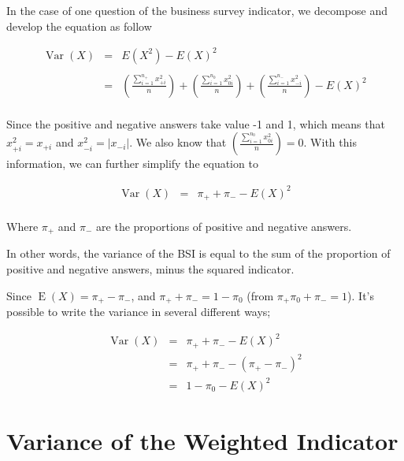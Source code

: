 \documentclass[12pt,a4paper,oneside]{book}
\DeclareMathOperator{\Var}{Var}
\DeclareMathOperator{\E}{E}
\begin{document}
In the case of one question of the business survey indicator, we decompose and develop the equation as follow

\begin{eqnarray}
\Var(X) &=&  E\left( X^2\right) - E\left( X\right)^2 \nonumber \\ \nonumber \\
    &=& \left( \frac{\sum_{i=1}^{n_+} x_{+i}^2}{n} \right)  + \left( \frac{\sum_{i=1}^{n_0} x_{0i}^2}{n} \right) + \left( \frac{\sum_{i=1}^{n_-} x_{-i}^2}{n} \right) - E(X)^2 \\ \nonumber 
\end{eqnarray}


Since the positive and negative answers take value -1 and 1, which means that $x_{+i}^2 = x_{+i}$ and $x_{-i}^2 = |x_{-i}|$. We also know that $\left( \frac{\sum_{i=1}^{n_0} x_{0i}^2}{n} \right) = 0$. 
With this information, we can further simplify the equation to

\begin{eqnarray}
    \Var(X) &=& \pi_+ + \pi_- - E ( X )^2 \label{var1} \\ \nonumber
\end{eqnarray}

Where $\pi_+$ and $\pi_-$ are the proportions of positive and negative answers.

In other words, the variance of the BSI is equal to the sum of the proportion of positive and negative answers, minus the squared indicator.

Since $\E(X)=\pi_+ - \pi_-$, and $\pi_+ + \pi_- = 1 - \pi_0$ (from $\pi_+ \pi_0 + \pi_- = 1$).
It's possible to write the variance in several different ways;


\begin{eqnarray}
\Var(X) &=& \pi_+ + \pi_- - E ( X )^2  \nonumber \\
        &=& \pi_+ + \pi_- - ( \pi_+ - \pi_- )^2 \label{eq:var2} \\
        &=& 1 - \pi_0 - E(X)^2 \label{eq:var3}
\end{eqnarray}




\section{Variance of the Weighted Indicator}
\end{document}

